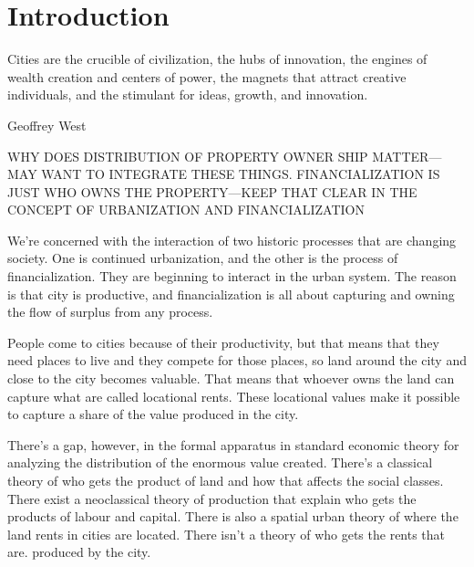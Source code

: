 \chapter{Introduction} \label{chapter-introduction}
\epigraph{Cities are the crucible of civilization, the hubs of innovation, the engines of wealth creation and centers of power, the magnets that attract creative individuals, and the stimulant for ideas, growth, and innovation.}{Geoffrey West \cite{westScaleUniversalLaws2017}}

WHY DOES DISTRIBUTION OF PROPERTY OWNER SHIP MATTER---MAY WANT TO INTEGRATE THESE THINGS. 
FINANCIALIZATION IS JUST WHO OWNS THE PROPERTY---KEEP THAT CLEAR IN THE CONCEPT OF URBANIZATION AND FINANCIALIZATION

We're concerned with the interaction of two historic processes that are changing society. 
One is continued urbanization, and the other is the process of financialization. %
They are beginning to interact in the urban system. 
The reason is that city is productive, and financialization is all about capturing and owning the flow of surplus from any process. 

People come to cities because of their productivity, but that means that they need places to live and they compete for those places, so land around the city and close to the city becomes valuable. That means that whoever owns the land can capture what are called \glspl{locational rent}.  These locational values make it possible to capture a share of the value produced in the city.

There's a gap, however, in the formal apparatus in standard economic theory for analyzing the distribution of the enormous value created. 
There's a classical theory of who gets the product of land and how that affects the social classes.
There exist a neoclassical theory of production that explain who gets the products of labour and capital. There is also a spatial urban theory of where the land rents in cities are located. There isn't a theory of who  gets the rents that are. produced by the city.






